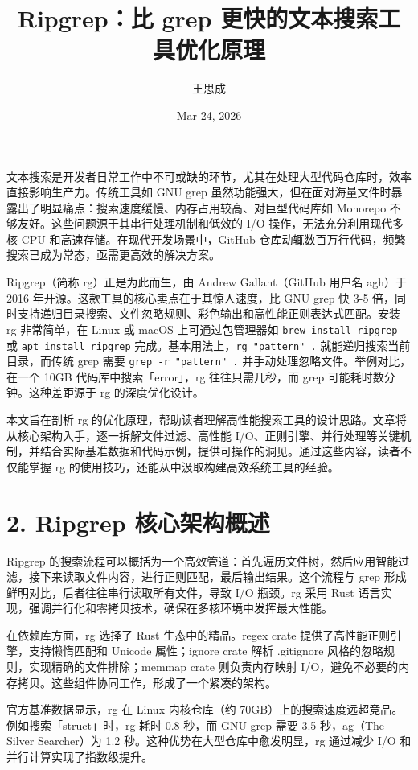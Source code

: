 \title{Ripgrep：比 grep 更快的文本搜索工具优化原理}
\author{王思成}
\date{Mar 24, 2026}
\maketitle
文本搜索是开发者日常工作中不可或缺的环节，尤其在处理大型代码仓库时，效率直接影响生产力。传统工具如 GNU grep 虽然功能强大，但在面对海量文件时暴露出了明显痛点：搜索速度缓慢、内存占用较高、对巨型代码库如 Monorepo 不够友好。这些问题源于其串行处理机制和低效的 I/O 操作，无法充分利用现代多核 CPU 和高速存储。在现代开发场景中，GitHub 仓库动辄数百万行代码，频繁搜索已成为常态，亟需更高效的解决方案。\par
Ripgrep（简称 rg）正是为此而生，由 Andrew Gallant（GitHub 用户名 agh）于 2016 年开源。这款工具的核心卖点在于其惊人速度，比 GNU grep 快 3-5 倍，同时支持递归目录搜索、文件忽略规则、彩色输出和高性能正则表达式匹配。安装 rg 非常简单，在 Linux 或 macOS 上可通过包管理器如 \texttt{brew install ripgrep} 或 \texttt{apt install ripgrep} 完成。基本用法上，\texttt{rg "pattern" .} 就能递归搜索当前目录，而传统 grep 需要 \texttt{grep -r "pattern" .} 并手动处理忽略文件。举例对比，在一个 10GB 代码库中搜索「error」，rg 往往只需几秒，而 grep 可能耗时数分钟。这种差距源于 rg 的深度优化设计。\par
本文旨在剖析 rg 的优化原理，帮助读者理解高性能搜索工具的设计思路。文章将从核心架构入手，逐一拆解文件过滤、高性能 I/O、正则引擎、并行处理等关键机制，并结合实际基准数据和代码示例，提供可操作的洞见。通过这些内容，读者不仅能掌握 rg 的使用技巧，还能从中汲取构建高效系统工具的经验。\par
\chapter{2. Ripgrep 核心架构概述}
Ripgrep 的搜索流程可以概括为一个高效管道：首先遍历文件树，然后应用智能过滤，接下来读取文件内容，进行正则匹配，最后输出结果。这个流程与 grep 形成鲜明对比，后者往往串行读取所有文件，导致 I/O 瓶颈。rg 采用 Rust 语言实现，强调并行化和零拷贝技术，确保在多核环境中发挥最大性能。\par
在依赖库方面，rg 选择了 Rust 生态中的精品。regex crate 提供了高性能正则引擎，支持懒惰匹配和 Unicode 属性；ignore crate 解析 .gitignore 风格的忽略规则，实现精确的文件排除；memmap crate 则负责内存映射 I/O，避免不必要的内存拷贝。这些组件协同工作，形成了一个紧凑的架构。\par
官方基准数据显示，rg 在 Linux 内核仓库（约 70GB）上的搜索速度远超竞品。例如搜索「struct」时，rg 耗时 0.8 秒，而 GNU grep 需要 3.5 秒，ag（The Silver Searcher）为 1.2 秒。这种优势在大型仓库中愈发明显，rg 通过减少 I/O 和并行计算实现了指数级提升。\par
